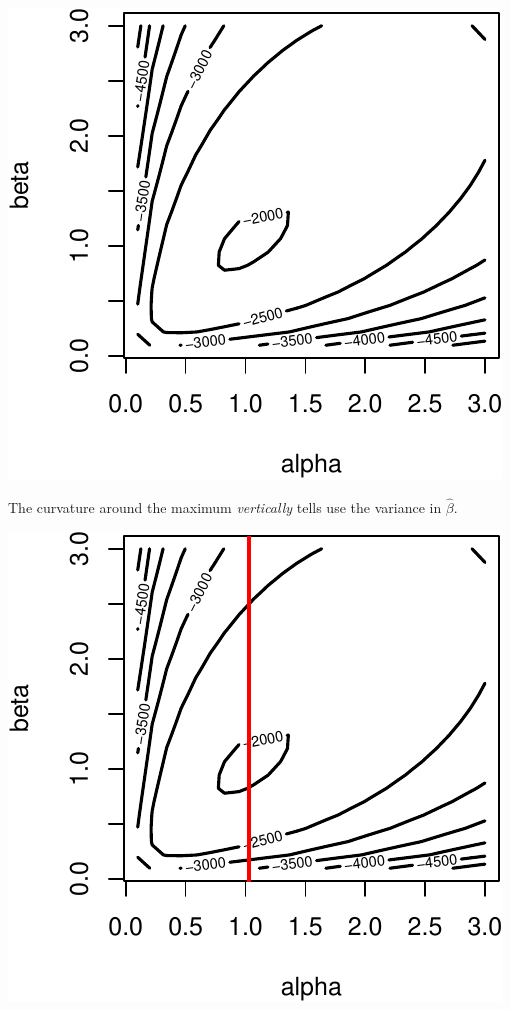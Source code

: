 \documentclass[
]{book}
\begin{document}
\includegraphics{04-02-wald-cis_files/figure-latex/unnamed-chunk-4-1.pdf}

The curvature around the maximum \emph{vertically} tells use the variance in \(\hat{\beta}\).

\includegraphics{04-02-wald-cis_files/figure-latex/unnamed-chunk-5-1.pdf}
\end{document}

